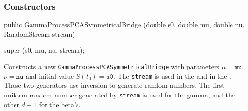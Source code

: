 \subsubsection* {Constructors}
\begin{code}

   public GammaProcessPCASymmetricalBridge (double s0, double mu, double nu,
                                            RandomStream stream) \begin{hide} {
        super (s0, mu, nu,  stream);
   }\end{hide}
\end{code}
\begin{tabb}
Constructs a new \texttt{GammaProcessPCASymmetricalBridge}
with parameters $\mu = \texttt{mu}$, $\nu = \texttt{nu}$ and initial
value $S(t_{0}) = \texttt{s0}$.
The  \texttt{stream}
is used in the
and in the .
These two generators use inversion to generate random numbers.  The first
uniform random number generated by \texttt{stream} is used for the gamma, and the
other $d-1$ for the beta's.
\end{tabb}

